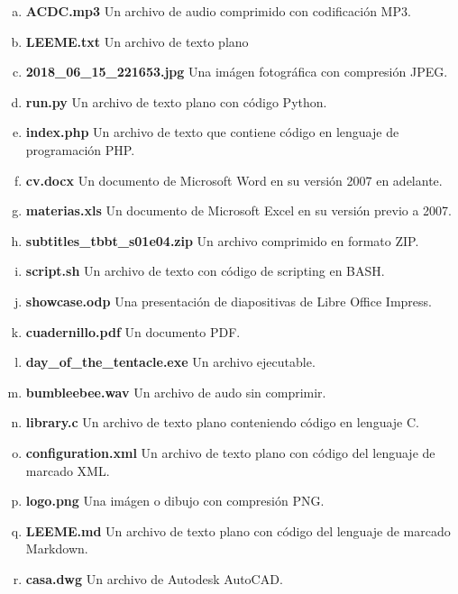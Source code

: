\begin{enumerate}[a)]
    \item \textbf{ACDC.mp3} Un archivo de audio comprimido con codificación MP3.
    \item \textbf{LEEME.txt} Un archivo de texto plano
    \item \textbf{2018\_06\_15\_221653.jpg} Una imágen fotográfica con compresión JPEG.
    \item \textbf{run.py} Un archivo de texto plano con código Python.
    \item \textbf{index.php} Un archivo de texto que contiene código en lenguaje de programación PHP.
    \item \textbf{cv.docx} Un documento de Microsoft Word en su versión 2007 en adelante.
    \item \textbf{materias.xls} Un documento de Microsoft Excel en su versión previo a 2007.
    \item \textbf{subtitles\_tbbt\_s01e04.zip} Un archivo comprimido en formato ZIP.
    \item \textbf{script.sh} Un archivo de texto con código de scripting en BASH.
    \item \textbf{showcase.odp} Una presentación de diapositivas de Libre Office Impress.
    \item \textbf{cuadernillo.pdf} Un documento PDF.
    \item \textbf{day\_of\_the\_tentacle.exe} Un archivo ejecutable.
    \item \textbf{bumbleebee.wav} Un archivo de audo sin comprimir.
    \item \textbf{library.c} Un archivo de texto plano conteniendo código en lenguaje C.
    \item \textbf{configuration.xml} Un archivo de texto plano con código del lenguaje de marcado XML.
    \item \textbf{logo.png} Una imágen o dibujo con compresión PNG.
    \item \textbf{LEEME.md} Un archivo de texto plano con código del lenguaje de marcado Markdown.
    \item \textbf{casa.dwg} Un archivo de Autodesk AutoCAD.
\end{enumerate}
\vspace{1cm}

